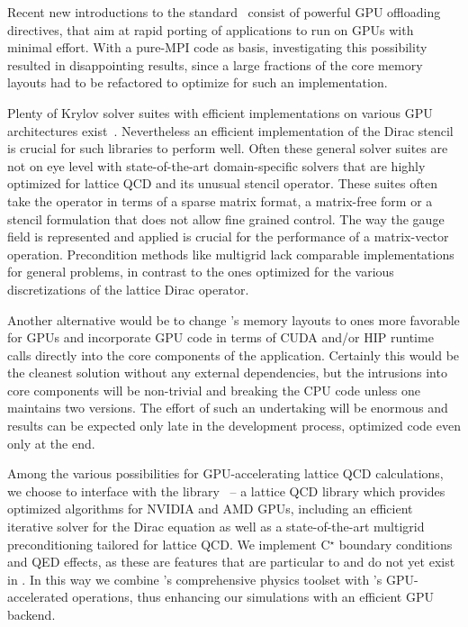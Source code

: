 
Recent new introductions to the \openmp standard~\cite{openmp,openmp:standard:4.0} consist of powerful GPU offloading directives, that aim at rapid porting of \openmp applications to run on GPUs with minimal effort.
With a pure-MPI code as basis, investigating this possibility resulted in disappointing results, since a large fractions of the core memory layouts had to be refactored to optimize for such an implementation.

Plenty of Krylov solver suites with efficient implementations on various GPU architectures exist~\cite{doi:10.1177/1094342016646844,7529929,866,816,833,KNIBBE2011281,ganesan2020sparshamglibraryhybridcpugpu,anzt2017preconditioned}.
Nevertheless an efficient implementation of the Dirac stencil is crucial for such libraries to perform well.
Often these general solver suites are not on eye level with state-of-the-art domain-specific solvers that are highly optimized for lattice QCD and its unusual stencil operator.
These suites often take the operator in terms of a sparse matrix format, a matrix-free form or a stencil formulation that does not allow fine grained control.
The way the gauge field is represented and applied is crucial for the performance of a matrix-vector operation.
Precondition methods like multigrid lack comparable implementations for general problems, in contrast to the ones optimized for the various discretizations of the lattice Dirac operator.

Another alternative would be to change \openqxd's memory layouts to ones more favorable for GPUs and incorporate GPU code in terms of CUDA and/or HIP runtime calls directly into the core components of the application. Certainly this would be the cleanest solution without any external dependencies, but the intrusions into core components will be non-trivial and breaking the CPU code unless one maintains two versions. The effort of such an undertaking will be enormous and results can be expected only late in the development process, optimized code even only at the end.

Among the various possibilities for GPU-accelerating lattice QCD calculations, we choose to interface \openqxd with the \quda library~\cite{QUDApaper,Babich:2011np,Clark:2016rdz} -- a lattice QCD library which provides optimized algorithms for NVIDIA and AMD GPUs, including an efficient iterative solver for the Dirac equation as well as a state-of-the-art multigrid preconditioning tailored for lattice QCD.
We implement C$^\star$ boundary conditions and QED effects, as these are features that are particular to \openqxd and do not yet exist in \quda.
In this way we combine \openqxd's comprehensive physics toolset with \quda's GPU-accelerated operations, thus enhancing our simulations with an efficient GPU backend.

